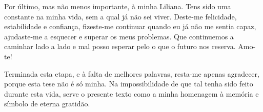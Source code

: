 \documentclass[class=report, crop=false, a4paper, 12pt]{standalone}
\begin{document}
\vspace{0.5\baselineskip}
\par Por último, mas não menos importante, à minha Liliana. Tens sido uma constante na minha vida, sem a qual já não sei viver. Deste-me felicidade, estabilidade e confiança, fizeste-me continuar quando eu já não me sentia capaz, ajudaste-me a esquecer e superar os meus problemas. Que continuemos a caminhar lado a lado e mal posso esperar pelo o que o futuro nos reserva. Amo-te!

\vspace{0.5\baselineskip}
\par Terminada esta etapa, e à falta de melhores palavras, resta-me apenas agradecer, porque esta tese não é só minha. Na impossibilidade de que tal tenha sido feito durante esta vida, serve o presente texto como a minha homenagem à memória e símbolo de eterna gratidão.
\end{document}
